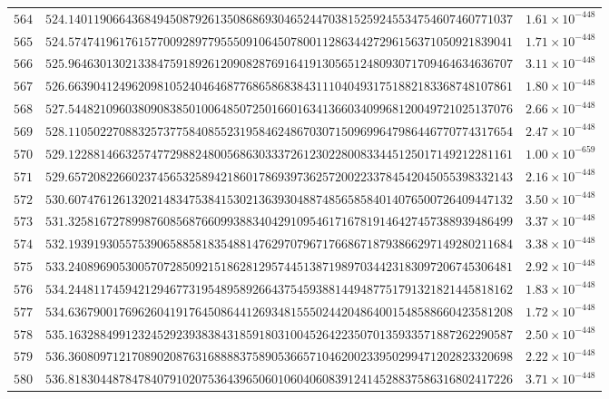 \documentclass[12pt,reqno]{amsart}
\theoremstyle{remark}
\begin{document}
\begin{longtable}{clc}
$564$ & $524.1401190664368494508792613508686930465244703815259245534754607460771037$ & $1.61\times 10^{-448}$ \\
$565$ & $524.5747419617615770092897795550910645078001128634427296156371050921839041$ & $1.71\times 10^{-448}$ \\
$566$ & $525.9646301302133847591892612090828769164191305651248093071709464634636707$ & $3.11\times 10^{-448}$ \\
$567$ & $526.6639041249620981052404646877686586838431110404931751882183368748107861$ & $1.80\times 10^{-448}$ \\
$568$ & $527.5448210960380908385010064850725016601634136603409968120049721025137076$ & $2.66\times 10^{-448}$ \\
$569$ & $528.1105022708832573775840855231958462486703071509699647986446770774317654$ & $2.47\times 10^{-448}$ \\
$570$ & $529.1228814663257477298824800568630333726123022800833445125017149212281161$ & $1.00\times 10^{-659}$ \\
$571$ & $529.6572082266023745653258942186017869397362572002233784542045055398332143$ & $2.16\times 10^{-448}$ \\
$572$ & $530.6074761261320214834753841530213639304887485658584014076500726409447132$ & $3.50\times 10^{-448}$ \\
$573$ & $531.3258167278998760856876609938834042910954617167819146427457388939486499$ & $3.37\times 10^{-448}$ \\
$574$ & $532.1939193055753906588581835488147629707967176686718793866297149280211684$ & $3.38\times 10^{-448}$ \\
$575$ & $533.2408969053005707285092151862812957445138719897034423183097206745306481$ & $2.92\times 10^{-448}$ \\
$576$ & $534.2448117459421294677319548958926643754593881449487751791321821445818162$ & $1.83\times 10^{-448}$ \\
$577$ & $534.6367900176962604191764508644126934815550244204864001548588660423581208$ & $1.72\times 10^{-448}$ \\
$578$ & $535.1632884991232452923938384318591803100452642235070135933571887262290587$ & $2.50\times 10^{-448}$ \\
$579$ & $536.3608097121708902087631688883758905366571046200233950299471202823320698$ & $2.22\times 10^{-448}$ \\
$580$ & $536.8183044878478407910207536439650601060406083912414528837586316802417226$ & $3.71\times 10^{-448}$ \\

\end{longtable}
\end{document}
